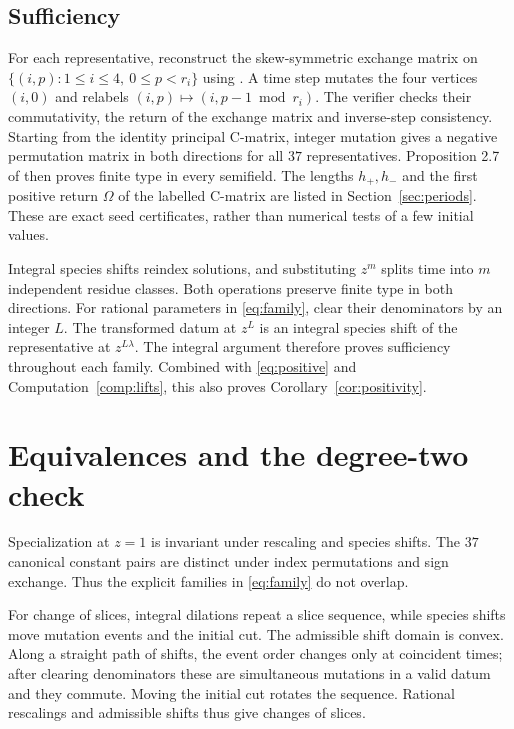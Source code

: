 \documentclass[11pt,a4paper]{article}
\theoremstyle{definition}
\begin{document}
\subsection*{Sufficiency}
For each representative, reconstruct the skew-symmetric exchange matrix
on $\{(i,p):1\le i\le4,\ 0\le p<r_i\}$ using
\cite[equation (2.2)]{Mizuno}. A time step mutates the four vertices $(i,0)$
and relabels $(i,p)\mapsto(i,p-1\bmod r_i)$. The verifier checks their
commutativity, the return of the exchange matrix and inverse-step consistency.
Starting from the identity principal C-matrix, integer mutation gives a
negative permutation matrix in both directions for all $37$ representatives.
Proposition 2.7 of \cite{Mizuno} then proves finite type in every semifield.
The lengths $h_+,h_-$ and the first positive return $\Omega$ of the labelled
C-matrix are listed in Section~\ref{sec:periods}. These are exact seed
certificates, rather than numerical tests of a few initial values.

Integral species shifts reindex solutions, and substituting $z^m$ splits
time into $m$ independent residue classes. Both operations preserve finite
type in both directions. For rational parameters in \eqref{eq:family}, clear
their denominators by an integer $L$. The transformed datum at $z^L$ is an
integral species shift of the representative at $z^{L\lambda}$. The integral
argument therefore proves sufficiency throughout each family. Combined
with \eqref{eq:positive} and Computation~\ref{comp:lifts}, this also proves
Corollary~\ref{cor:positivity}.

\section{Equivalences and the degree-two check}\label{sec:slices}
Specialization at $z=1$ is invariant under rescaling and species shifts.
The $37$ canonical constant pairs are distinct under index permutations
and sign exchange. Thus the explicit families in \eqref{eq:family} do not
overlap.

For change of slices, integral dilations repeat a slice sequence, while
species shifts move mutation events and the initial cut. The admissible
shift domain is convex. Along a straight path of shifts, the event order
changes only at coincident times; after clearing denominators these are
simultaneous mutations in a valid datum and they commute. Moving the initial
cut rotates the sequence. Rational rescalings and admissible shifts thus
give changes of slices.
\end{document}
